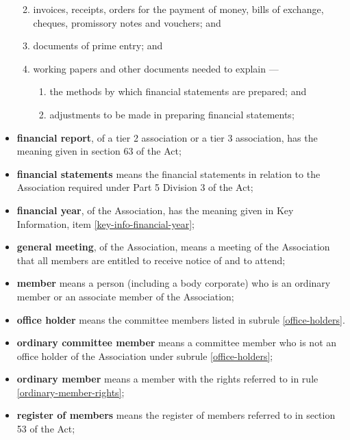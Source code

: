 \documentclass[../constitution.tex]{subfiles}
\begin{document}
\begin{itemize}[label={-}]
        \begin{enumerate}
          \def\labelenumi{\alph{enumi})}
          \setcounter{enumi}{0}

          \item invoices, receipts, orders for the payment of money, bills of exchange, cheques, promissory notes and vouchers; and
          \item documents of prime entry; and
          \item working papers and other documents needed to explain ---
                \begin{enumerate}
                  \def\labelenumi{\roman{enumi})}
                  \setcounter{enumi}{0}
                  \item the methods by which financial statements are prepared; and
                  \item adjustments to be made in preparing financial statements;
                \end{enumerate}
        \end{enumerate}
  \item \textbf{financial report}, of a tier 2 association or a tier 3 association, has the meaning given in section 63 of the Act;
  \item \textbf{financial statements} means the financial statements in relation to the Association required under Part 5 Division 3 of the Act;
  \item \textbf{financial year}, of the Association, has the meaning given in Key Information, item \ref{key-info-financial-year};
  \item \textbf{general meeting}, of the Association, means a meeting of the Association that all members are entitled to receive notice of and to attend;
  \item \textbf{member} means a person (including a body corporate) who is an ordinary member or an associate member of the Association;
  \item \textbf{office holder} means the committee members listed in subrule \ref{office-holders}.
  \item \textbf{ordinary committee member} means a committee member who is not an office holder of the Association under subrule \ref{office-holders};
  \item \textbf{ordinary member} means a member with the rights referred to in rule \ref{ordinary-member-rights};
  \item \textbf{register of members} means the register of members referred to in section 53 of the Act;

\end{itemize}
\end{document}
